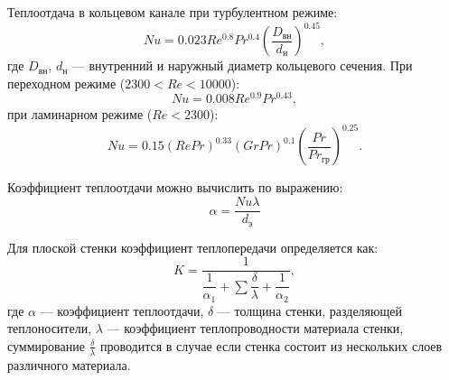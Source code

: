 Теплоотдача в кольцевом канале \cite{dit_posobie} при турбулентном режиме:
\begin{equation}
Nu=0.023 Re^{0.8} Pr^{0.4} \left(\dfrac{D_{вн}}{d_{н}}\right)^{0.45},
\end{equation}
где $D_{вн}$, $d_н$ --- внутренний и наружный  диаметр кольцевого сечения. При переходном режиме ($2300 < Re < 10000$):
\begin{equation}
	Nu=0.008 Re^{0.9} Pr^{0.43},
\end{equation}
при ламинарном режиме ($Re < 2300$):
\begin{equation}
Nu=0.15 (Re Pr)^{0.33} (Gr Pr)^{0.1} \left( \dfrac{Pr}{Pr_{гр}} \right) ^{0.25}.
\end{equation}

Коэффициент теплоотдачи можно вычислить по выражению:
\begin{equation}
\alpha = \dfrac{Nu \lambda}{d_э}
\end{equation}


Для плоской стенки коэффициент теплопередачи определяется как:
\begin{equation}
	K=\dfrac{1}{\dfrac{1}{\alpha_1} + \sum \dfrac{\delta}{\lambda} + \dfrac{1}{\alpha_2}},
\end{equation}
где $\alpha$ --- коэффициент теплоотдачи, $\delta$ --- толщина стенки, разделяющей теплоносители, $\lambda$ --- коэффициент теплопроводности материала стенки, суммирование $\frac{\delta}{\lambda}$ проводится в случае если стенка состоит из нескольких слоев различного материала. 




 
%		 


